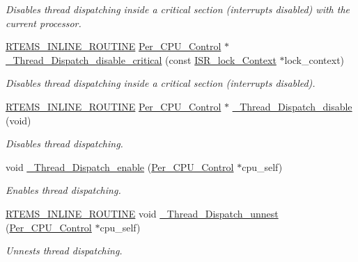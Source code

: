 \begin{DoxyCompactItemize}
\begin{DoxyCompactList}\small\item\em Disables thread dispatching inside a critical section (interrupts disabled) with the current processor. \end{DoxyCompactList}\item 
\mbox{\hyperlink{group__RTEMSScoreBaseDefs_gac216239df231d5dbd15e3520b0b9313f}{R\+T\+E\+M\+S\+\_\+\+I\+N\+L\+I\+N\+E\+\_\+\+R\+O\+U\+T\+I\+NE}} \mbox{\hyperlink{structPer__CPU__Control}{Per\+\_\+\+C\+P\+U\+\_\+\+Control}} $\ast$ \mbox{\hyperlink{group__RTEMSScoreThread_ga5ffeb81480c63293a317f69efc74dec3}{\+\_\+\+Thread\+\_\+\+Dispatch\+\_\+disable\+\_\+critical}} (const \mbox{\hyperlink{structISR__lock__Context}{I\+S\+R\+\_\+lock\+\_\+\+Context}} $\ast$lock\+\_\+context)
\begin{DoxyCompactList}\small\item\em Disables thread dispatching inside a critical section (interrupts disabled). \end{DoxyCompactList}\item 
\mbox{\hyperlink{group__RTEMSScoreBaseDefs_gac216239df231d5dbd15e3520b0b9313f}{R\+T\+E\+M\+S\+\_\+\+I\+N\+L\+I\+N\+E\+\_\+\+R\+O\+U\+T\+I\+NE}} \mbox{\hyperlink{structPer__CPU__Control}{Per\+\_\+\+C\+P\+U\+\_\+\+Control}} $\ast$ \mbox{\hyperlink{group__RTEMSScoreThread_ga044bfb6e9317180d21b05c5338cedd1a}{\+\_\+\+Thread\+\_\+\+Dispatch\+\_\+disable}} (void)
\begin{DoxyCompactList}\small\item\em Disables thread dispatching. \end{DoxyCompactList}\item 
void \mbox{\hyperlink{group__RTEMSScoreThread_gab0c773b97624be1dc304a2d3d038f19a}{\+\_\+\+Thread\+\_\+\+Dispatch\+\_\+enable}} (\mbox{\hyperlink{structPer__CPU__Control}{Per\+\_\+\+C\+P\+U\+\_\+\+Control}} $\ast$cpu\+\_\+self)
\begin{DoxyCompactList}\small\item\em Enables thread dispatching. \end{DoxyCompactList}\item 
\mbox{\hyperlink{group__RTEMSScoreBaseDefs_gac216239df231d5dbd15e3520b0b9313f}{R\+T\+E\+M\+S\+\_\+\+I\+N\+L\+I\+N\+E\+\_\+\+R\+O\+U\+T\+I\+NE}} void \mbox{\hyperlink{group__RTEMSScoreThread_ga89324d5b965715261d6fa55527297b1a}{\+\_\+\+Thread\+\_\+\+Dispatch\+\_\+unnest}} (\mbox{\hyperlink{structPer__CPU__Control}{Per\+\_\+\+C\+P\+U\+\_\+\+Control}} $\ast$cpu\+\_\+self)
\begin{DoxyCompactList}\small\item\em Unnests thread dispatching. \end{DoxyCompactList}\item 

\end{DoxyCompactItemize}
